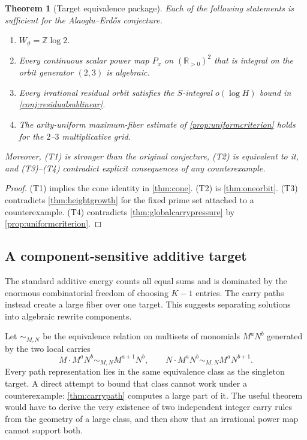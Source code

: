 \documentclass[11pt,oneside]{article}
\newtheorem{theorem}{Theorem}[section]
\theoremstyle{definition}
\newcommand{\R}{\mathbb{R}}
\newcommand{\Z}{\mathbb{Z}}
\begin{document}
\begin{theorem}[Target equivalence package]\label{thm:targetpackage}
Each of the following statements is sufficient for the Alaoglu--Erd\H{o}s conjecture.
\begin{enumerate}[label=\textup{(T\arabic*)}]
\item $W_{\vartheta}=\Z\log2$.
\item Every continuous scalar power map $P_x$ on $(\R_{>0})^2$ that is integral on the orbit generator $(2,3)$ is algebraic.
\item Every irrational residual orbit satisfies the $S$-integral $o(\log H)$ bound in \cref{conj:residualsublinear}.
\item The arity-uniform maximum-fiber estimate of \cref{prop:uniformcriterion} holds for the $2$--$3$ multiplicative grid.
\end{enumerate}
Moreover, (T1) is stronger than the original conjecture, (T2) is equivalent to it, and (T3)--(T4) contradict explicit consequences of any counterexample.
\end{theorem}

\begin{proof}
(T1) implies the cone identity in \cref{thm:cone}.  (T2) is
\cref{thm:oneorbit}.  (T3) contradicts \cref{thm:heightgrowth} for the fixed prime set attached to a counterexample.  (T4) contradicts \cref{thm:globalcarrypressure} by \cref{prop:uniformcriterion}.
\end{proof}

\subsection{A component-sensitive additive target}

The standard additive energy counts all equal sums and is dominated by the enormous combinatorial freedom of choosing $K-1$ entries.  The carry paths instead create a large fiber over one target.  This suggests separating solutions into algebraic rewrite components.

Let $\sim_{M,N}$ be the equivalence relation on multisets of monomials
$M^aN^b$ generated by the two local carries
\[
   M\cdot M^aN^b\sim_{M,N}M^{a+1}N^b,
   \qquad
   N\cdot M^aN^b\sim_{M,N}M^aN^{b+1}.
\]
Every path representation lies in the same equivalence class as the singleton target.  A direct attempt to bound that class cannot work under a counterexample: \cref{thm:carrypath} computes a large part of it.  The useful theorem would have to derive the very existence of two independent integer carry rules from the geometry of a large class, and then show that an irrational power map cannot support both.
\end{document}
